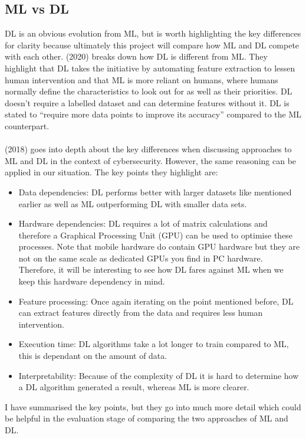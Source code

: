 \documentclass{article}
\begin{document}
\subsection{ML vs DL}
DL is an obvious evolution from ML, but is worth highlighting the key differences for clarity because ultimately this 
project will compare how ML and DL compete with each other. \citeauthor{kav2020} (2020) breaks down how DL is different from ML. 
They highlight that DL takes the initiative by automating feature extraction to lessen human intervention and that ML is
 more reliant on humans, where humans normally define the characteristics to look out for as well as their priorities. 
 DL doesn’t require a labelled dataset and can determine features without it. DL is stated to “require more data points 
 to improve its accuracy” compared to the ML counterpart.
 \\
 \\
 \citeauthor{8359287} (2018) goes into depth about the key differences when discussing approaches to ML and DL in the context
  of cybersecurity. However, the same reasoning can be applied in our situation. The key points they highlight are:
  \begin{itemize}
      \item Data dependencies: DL performs better with larger datasets like mentioned earlier as well as ML 
      outperforming DL with smaller data sets.
      \item Hardware dependencies: DL requires a lot of matrix calculations and therefore a Graphical Processing 
      Unit (GPU) can be used to optimise these processes. Note that mobile hardware do contain GPU hardware but they are
       not on the same scale as dedicated GPUs you find in PC hardware. Therefore, it will be interesting to see how DL 
       fares against ML when we keep this hardware dependency in mind.
    \item Feature processing: Once again iterating on the point mentioned before, DL can extract features directly 
    from the data and requires less human intervention.
    \item Execution time: DL algorithms take a lot longer to train compared to ML, this is dependant on the amount of 
    data.
    \item Interpretability: Because of the complexity of DL it is hard to determine how a DL algorithm generated a 
    result, whereas ML is more clearer.
  \end{itemize}
  I have summarised the key points, but they go into much more detail which could be helpful in the evaluation stage 
    of comparing the two approaches of ML and DL.
\end{document}
